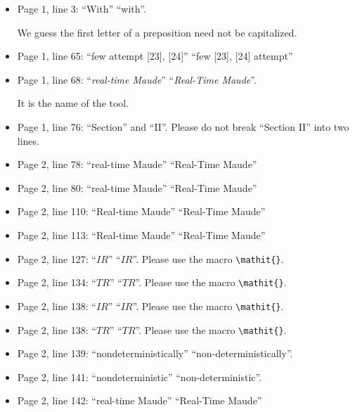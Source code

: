 \documentclass[12pt,onecolumn]{IEEEtranTIE}
\begin{document}
\begin{itemize}\setlength{\itemsep}{10pt}

\item Page 1, line 3: ``With'' \by ``with''.

We guess the first letter of a preposition need not be capitalized.

\item Page 1, line 65: ``few attempt [23], [24]'' \by ``few [23], [24] attempt''

\item Page 1, line 68: ``\emph{real-time Maude}'' \by ``\emph{Real-Time Maude}''.

It is the name of the tool.

\item Page 1, line 76: ``Section'' and ``II''. Please do not break
  ``Section II'' into two lines.

\item Page 2, line 78: ``real-time Maude'' \by ``Real-Time Maude''

\item Page 2, line 80: ``real-time Maude'' \by ``Real-Time Maude''
  
\item Page 2, line 110: ``Real-time Maude'' \by ``Real-Time Maude''

\item Page 2, line 113: ``Real-time Maude'' \by ``Real-Time Maude''

\item Page 2, line 127: ``$IR$'' \by ``$\mathit{IR}$''. Please use the
  macro \verb|\mathit{}|.

\item Page 2, line 134: ``$TR$'' \by ``$\mathit{TR}$''. Please use the
  macro \verb|\mathit{}|.

\item Page 2, line 138: ``$IR$'' \by ``$\mathit{IR}$''. Please use the
  macro \verb|\mathit{}|.  

\item Page 2, line 138: ``$TR$'' \by ``$\mathit{TR}$''. Please use the
  macro \verb|\mathit{}|.

\item Page 2, line 139: ``nondeterministically'' \by
  ``non-deterministically''.

\item Page 2, line 141: ``nondeterministic'' \by
  ``non-deterministic''.

\item Page 2, line 142: ``real-time Maude'' \by ``Real-Time Maude''


\end{itemize}
\end{document}
